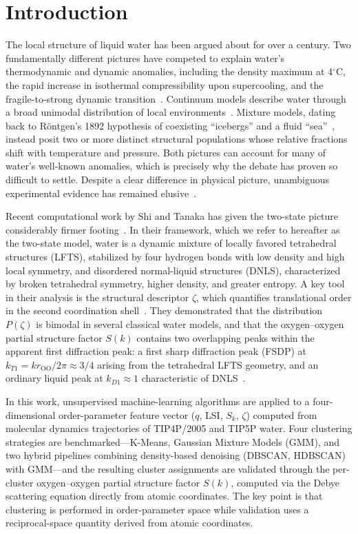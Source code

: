 \documentclass[aps, amsmath,amssymb, reprint, twocolumn, superscriptaddress]{revtex4-1}
\begin{document}
\section{Introduction}

The local structure of liquid water has been argued about for over a century. Two fundamentally different pictures have competed to explain water's thermodynamic and dynamic anomalies, including the density maximum at 4$^\circ$C, the rapid increase in isothermal compressibility upon supercooling, and the fragile-to-strong dynamic transition~\cite{gallo_water_2016}. Continuum models describe water through a broad unimodal distribution of local environments~\cite{narten_observed_1969, eisenberg_structure_2005}. Mixture models, dating back to R\"{o}ntgen's 1892 hypothesis of coexisting ``icebergs'' and a fluid ``sea''~\cite{rontgen-1892}, instead posit two or more distinct structural populations whose relative fractions shift with temperature and pressure. Both pictures can account for many of water's well-known anomalies, which is precisely why the debate has proven so difficult to settle. Despite a clear difference in
physical picture, unambiguous experimental evidence has remained elusive~\cite{narten_observed_1969,eisenberg_structure_2005,handle_supercooled_2017}.

Recent computational work by Shi and Tanaka has given the two-state picture considerably firmer footing~\cite{shi_direct_2020,russo_understanding_2014,shi_microscopic_2018}. In their framework, which we refer to hereafter as the two-state model, water is a dynamic mixture of locally favored tetrahedral structures (LFTS), stabilized by four hydrogen bonds with low density and high local symmetry, and disordered normal-liquid structures (DNLS), characterized by broken tetrahedral symmetry, higher density, and greater entropy. A key tool in their analysis is the structural descriptor $\zeta$, which quantifies translational order in the second coordination shell~\cite{russo_understanding_2014}. They demonstrated that the distribution $P(\zeta)$ is bimodal in several classical water models, and that the oxygen--oxygen partial structure factor $S(k)$ contains two overlapping peaks within the apparent first diffraction peak: a first sharp diffraction peak (FSDP) at $k_{T1} = kr_{\mathrm{OO}}/2\pi \approx 3/4$ arising from the tetrahedral LFTS geometry, and an ordinary liquid peak at $k_{D1} \approx 1$ characteristic of DNLS~\cite{shi_direct_2020,shi-2019}.

In this work, unsupervised machine-learning algorithms are applied to a four-dimensional order-parameter feature vector ($q$, LSI, $S_k$, $\zeta$) computed from molecular dynamics trajectories of TIP4P/2005 and TIP5P water. Four clustering strategies are benchmarked---K-Means, Gaussian Mixture Models (GMM), and two hybrid pipelines combining density-based denoising (DBSCAN, HDBSCAN) with GMM---and the resulting cluster assignments are validated through the per-cluster oxygen--oxygen partial structure factor $S(k)$, computed via the Debye scattering equation directly from atomic coordinates. The key point is that clustering is performed in order-parameter space while validation uses a reciprocal-space quantity derived from atomic coordinates.
\end{document}
